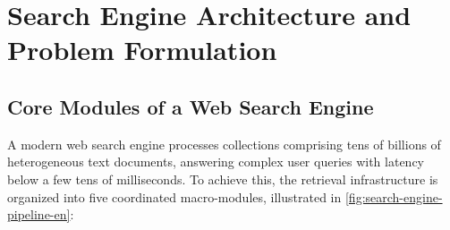 \FloatBarrier
\section{Search Engine Architecture and Problem Formulation}
\label{sec:search-engine-architecture-en}

\subsection{Core Modules of a Web Search Engine}
A modern web search engine processes collections comprising tens of billions of heterogeneous text documents, answering complex user queries with latency below a few tens of milliseconds. To achieve this, the retrieval infrastructure is organized into five coordinated macro-modules, illustrated in \autoref{fig:search-engine-pipeline-en}:

